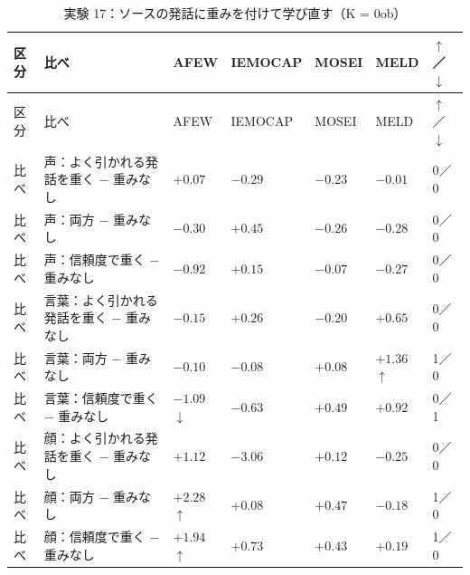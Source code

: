 \begin{longtable}{>{\raggedright}p{0.75cm}>{\raggedright}p{5.6cm}>{\raggedright}p{2.05cm}>{\raggedright}p{2.05cm}>{\raggedright}p{2.05cm}>{\raggedright}p{2.05cm}p{0.75cm}}
\caption{実験 17：ソースの発話に重みを付けて学び直す（K = 0ob）}\\
\toprule
区分 & 比べ & AFEW & IEMOCAP & MOSEI & MELD & $\uparrow$／$\downarrow$ \\
\midrule
\endfirsthead
\toprule
区分 & 比べ & AFEW & IEMOCAP & MOSEI & MELD & $\uparrow$／$\downarrow$ \\
\midrule
\endhead
\bottomrule
\endfoot

比べ & 声：よく引かれる発話を重く $-$ 重みなし & $+0.07$ & $-0.29$ & $-0.23$ & $-0.01$ & 0／0 \\
比べ & 声：両方 $-$ 重みなし & $-0.30$ & $+0.45$ & $-0.26$ & $-0.28$ & 0／0 \\
比べ & 声：信頼度で重く $-$ 重みなし & $-0.92$ & $+0.15$ & $-0.07$ & $-0.27$ & 0／0 \\
比べ & 言葉：よく引かれる発話を重く $-$ 重みなし & $-0.15$ & $+0.26$ & $-0.20$ & $+0.65$ & 0／0 \\
比べ & 言葉：両方 $-$ 重みなし & $-0.10$ & $-0.08$ & $+0.08$ & $+1.36$$\uparrow$ & 1／0 \\
比べ & 言葉：信頼度で重く $-$ 重みなし & $-1.09$$\downarrow$ & $-0.63$ & $+0.49$ & $+0.92$ & 0／1 \\
比べ & 顔：よく引かれる発話を重く $-$ 重みなし & $+1.12$ & $-3.06$ & $+0.12$ & $-0.25$ & 0／0 \\
比べ & 顔：両方 $-$ 重みなし & $+2.28$$\uparrow$ & $+0.08$ & $+0.47$ & $-0.18$ & 1／0 \\
比べ & 顔：信頼度で重く $-$ 重みなし & $+1.94$$\uparrow$ & $+0.73$ & $+0.43$ & $+0.19$ & 1／0 \\
\end{longtable}
